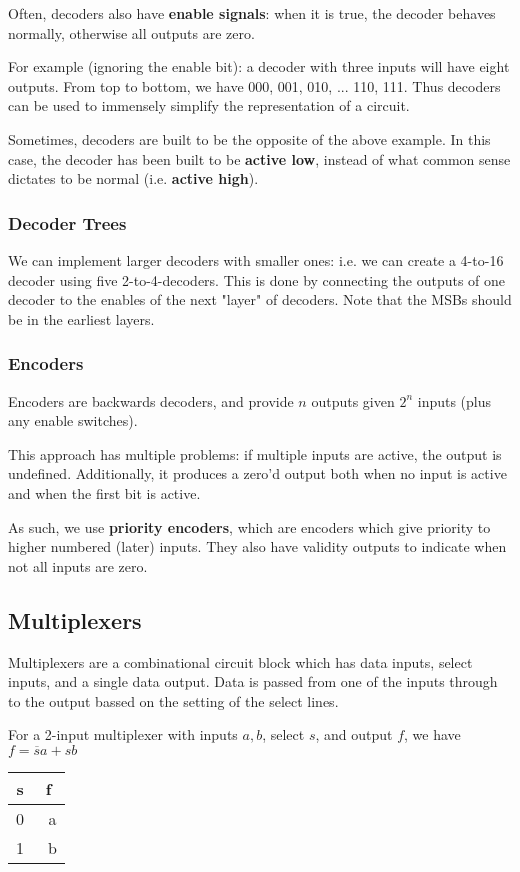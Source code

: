 \documentclass[12pt]{article}
\begin{document}
Often, decoders also have {\bf enable signals}: when it is true, the decoder behaves normally, otherwise all outputs are zero.

For example (ignoring the enable bit): a decoder with three inputs will have eight outputs. From top to bottom, we have 000, 001, 010, ... 110, 111. Thus decoders can be used to immensely simplify the representation of a circuit.

Sometimes, decoders are built to be the opposite of the above example. In this case, the decoder has been built to be {\bf active low}, instead of what common sense dictates to be normal (i.e. {\bf active high}).

\subsubsection*{Decoder Trees}
We can implement larger decoders with smaller ones: i.e. we can create a 4-to-16 decoder using five 2-to-4-decoders. This is done by connecting the outputs of one decoder to the enables of the next "layer" of decoders. Note that the MSBs should be in the earliest layers.

\subsubsection*{Encoders}
Encoders are backwards decoders, and provide $n$ outputs given $2^n$ inputs (plus any enable switches).

This approach has multiple problems: if multiple inputs are active, the output is undefined. Additionally, it produces a zero'd output both when no input is active and when the first bit is active.

As such, we use {\bf priority encoders}, which are encoders which give priority to higher numbered (later) inputs. They also have validity outputs to indicate when not all inputs are zero.

\subsection*{Multiplexers}
Multiplexers are a combinational circuit block which has data inputs, select inputs, and a single data output. Data is passed from one of the inputs through to the output bassed on the setting of the select lines.

For a 2-input multiplexer with inputs $a,b$, select $s$, and output $f$, we have $f = \overline{s}a + sb$

\begin{table}[ht]\centering\begin{tabular}{c|c}s & f \\ \hline 0 & a \\ 1 & b \\\end{tabular}\end{table}
\end{document}

